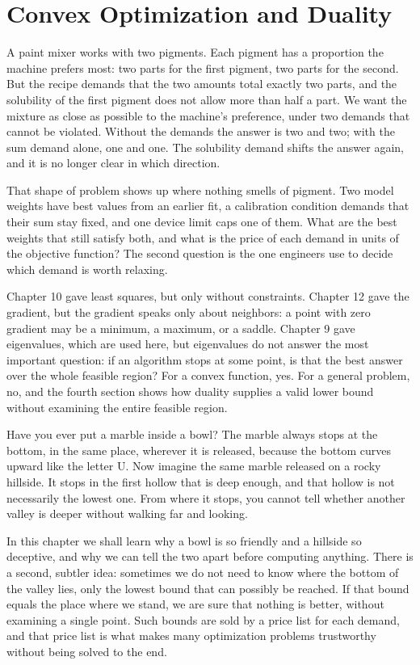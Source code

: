 \chapter{Convex Optimization and Duality}

A paint mixer works with two pigments. Each pigment has a proportion the machine prefers
most: two parts for the first pigment, two parts for the second. But the recipe demands that
the two amounts total exactly two parts, and the solubility of the first pigment does not
allow more than half a part. We want the mixture as close as possible to the machine's
preference, under two demands that cannot be violated. Without the demands the answer is two
and two; with the sum demand alone, one and one. The solubility demand shifts the answer
again, and it is no longer clear in which direction.

That shape of problem shows up where nothing smells of pigment. Two model weights have best
values from an earlier fit, a calibration condition demands that their sum stay fixed, and
one device limit caps one of them. What are the best weights that still satisfy both, and
what is the price of each demand in units of the objective function? The second question is
the one engineers use to decide which demand is worth relaxing.

Chapter 10 gave least squares, but only without constraints. Chapter 12 gave the gradient,
but the gradient speaks only about neighbors: a point with zero gradient may be a minimum, a
maximum, or a saddle. Chapter 9 gave eigenvalues, which are used here, but eigenvalues do not
answer the most important question: if an algorithm stops at some point, is that the best
answer over the whole feasible region? For a convex function, yes. For a general problem, no,
and the fourth section shows how duality supplies a valid lower bound without examining the
entire feasible region.

\begin{untukanak}
Have you ever put a marble inside a bowl? The marble always stops at the bottom, in the same
place, wherever it is released, because the bottom curves upward like the letter U. Now
imagine the same marble released on a rocky hillside. It stops in the first hollow that is
deep enough, and that hollow is not necessarily the lowest one. From where it stops, you
cannot tell whether another valley is deeper without walking far and looking.

In this chapter we shall learn why a bowl is so friendly and a hillside so deceptive, and why
we can tell the two apart before computing anything. There is a second, subtler idea:
sometimes we do not need to know where the bottom of the valley lies, only the lowest bound
that can possibly be reached. If that bound equals the place where we stand, we are sure that
nothing is better, without examining a single point. Such bounds are sold by a price list for
each demand, and that price list is what makes many optimization problems trustworthy without
being solved to the end.
\end{untukanak}


